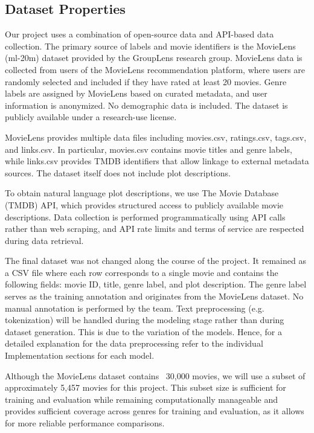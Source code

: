\subsection{Dataset Properties}
Our project uses a combination of open-source data and API-based data collection. 
The primary source of labels and movie identifiers is the MovieLens (ml-20m) dataset provided by the GroupLens research group. 
MovieLens data is collected from users of the MovieLens recommendation platform, where users are randomly selected and included if they have rated at least 20 movies. 
Genre labels are assigned by MovieLens based on curated metadata, and user information is anonymized. 
No demographic data is included. The dataset is publicly available under a research-use license.

MovieLens provides multiple data files including movies.csv, ratings.csv, tags.csv, and links.csv. 
In particular, movies.csv contains movie titles and genre labels, while links.csv provides TMDB identifiers that allow linkage to external metadata sources. 
The dataset itself does not include plot descriptions.

To obtain natural language plot descriptions, we use The Movie Database (TMDB) API, which provides structured access to publicly available movie descriptions. 
Data collection is performed programmatically using API calls rather than web scraping, and API rate limits and terms of service are respected during data retrieval. 

The final dataset was not changed along the course of the project. It remained as a CSV file where each row corresponds to a single movie and contains the following fields: movie ID, title, genre label, and plot description. 
The genre label serves as the training annotation and originates from the MovieLens dataset. 
No manual annotation is performed by the team. Text preprocessing (e.g. tokenization) will be handled during the modeling stage rather than during dataset generation. 
This is due to the variation of the models. 
Hence, for a detailed explanation for the data preprocessing refer to the individual Implementation sections for each model.

Although the MovieLens dataset contains ~30,000 movies, we will use a subset of approximately 5,457 movies for this project. 
This subset size is sufficient for training and evaluation while remaining computationally manageable and provides sufficient coverage across genres for training and evaluation, as it allows for more reliable performance comparisons.



